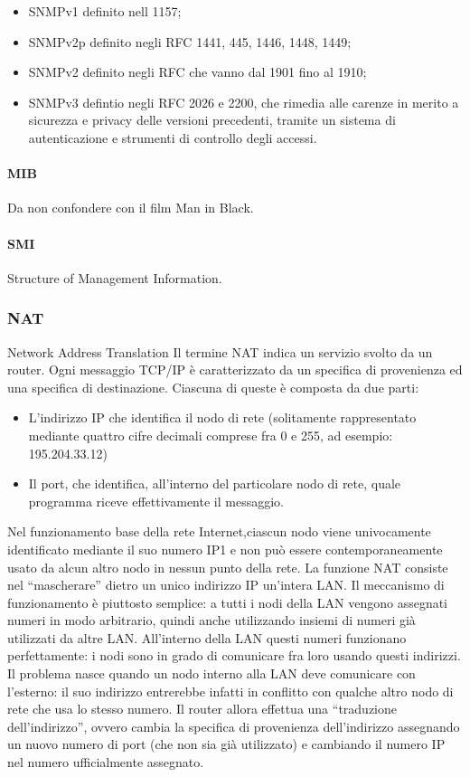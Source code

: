 \documentclass[a4paper,11pt]{article}
\def\subsub#1{\subsubsection{#1}\label{#1}}
\def\para#1{\paragraph{#1}\label{#1}}
\def\vedi#1{\nameref{#1}}
\begin{document}
\begin{itemize}
\item SNMPv1 definito nell \vedi{RFC} 1157;
\item SNMPv2p definito negli RFC 1441, 445, 1446, 1448, 1449;
\item SNMPv2 definito negli RFC che vanno dal 1901 fino al 1910;
\item SNMPv3 defintio negli RFC 2026 e 2200, che rimedia alle carenze in merito a sicurezza e privacy delle versioni precedenti, tramite un sistema di autenticazione e strumenti di controllo degli accessi.
\end{itemize}
\para{MIB} Da non confondere con il film Man in Black.
\para{SMI} Structure of Management Information.
\subsub{NAT}
Network Address Translation
Il termine NAT indica un servizio svolto da un router.
 Ogni messaggio TCP/IP è caratterizzato da un specifica di provenienza ed una specifica di destinazione.
 Ciascuna di queste è composta da due parti:
 \begin{itemize}
 	\item L’indirizzo IP che identifica il nodo di rete (solitamente rappresentato mediante quattro cifre decimali comprese fra 0 e 255, ad esempio:
 	195.204.33.12) 
 	\item Il port, che identifica, all’interno del particolare nodo di rete, quale programma riceve effettivamente il messaggio.
 \end{itemize}
 
 Nel funzionamento base della rete Internet,ciascun nodo viene univocamente identificato mediante il suo numero IP1 e non può essere contemporaneamente usato da alcun altro nodo in nessun punto della rete.
 La funzione NAT consiste nel “mascherare” dietro un unico indirizzo IP un’intera LAN.
 Il meccanismo di funzionamento è
 piuttosto semplice: a tutti i nodi della LAN vengono assegnati numeri in modo arbitrario, quindi anche utilizzando insiemi di numeri già utilizzati da altre
 LAN. All’interno della LAN questi numeri funzionano
 perfettamente: i nodi sono in grado di comunicare fra loro usando questi indirizzi.
 Il problema nasce quando un nodo interno alla LAN deve
 comunicare con l’esterno: il suo indirizzo entrerebbe infatti in conflitto con qualche altro nodo di rete che usa lo stesso numero. Il router allora effettua
 una “traduzione dell’indirizzo”, ovvero cambia la specifica di provenienza dell’indirizzo assegnando un nuovo numero di port (che non sia già
 utilizzato) e cambiando il numero IP nel numero ufficialmente assegnato.
\end{document}
